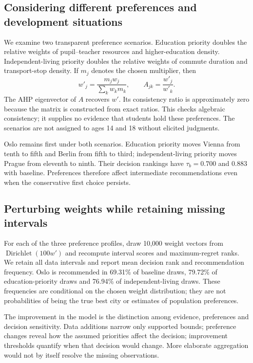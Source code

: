 \documentclass[11pt]{article}
\begin{document}
\subsection{Considering different preferences and development situations}
We examine two transparent preference scenarios. Education priority doubles the relative weights of pupil--teacher resources and higher-education density. Independent-living priority doubles the relative weights of commute duration and transport-stop density. If $m_j$ denotes the chosen multiplier, then
\begin{equation}
 w'_j=\frac{m_jw_j}{\sum_kw_km_k},\qquad A_{jk}=\frac{w'_j}{w'_k}.
\end{equation}
The AHP eigenvector of $A$ recovers $w'$. Its consistency ratio is approximately zero because the matrix is constructed from exact ratios. This checks algebraic consistency; it supplies no evidence that students hold these preferences. The scenarios are not assigned to ages 14 and 18 without elicited judgments.

Oslo remains first under both scenarios. Education priority moves Vienna from tenth to fifth and Berlin from fifth to third; independent-living priority moves Prague from eleventh to ninth. Their decision rankings have $\tau_b=0.700$ and $0.883$ with baseline. Preferences therefore affect intermediate recommendations even when the conservative first choice persists.

\subsection{Perturbing weights while retaining missing intervals}
For each of the three preference profiles, draw 10,000 weight vectors from $\operatorname{Dirichlet}(100w')$ and recompute interval scores and maximum-regret ranks. We retain all data intervals and report mean decision rank and recommendation frequency. Oslo is recommended in 69.31\% of baseline draws, 79.72\% of education-priority draws and 76.94\% of independent-living draws. These frequencies are conditional on the chosen weight distribution; they are not probabilities of being the true best city or estimates of population preferences.

The improvement in the model is the distinction among evidence, preferences and decision sensitivity. Data additions narrow only supported bounds; preference changes reveal how the assumed priorities affect the decision; improvement thresholds quantify when that decision would change. More elaborate aggregation would not by itself resolve the missing observations.
\end{document}
